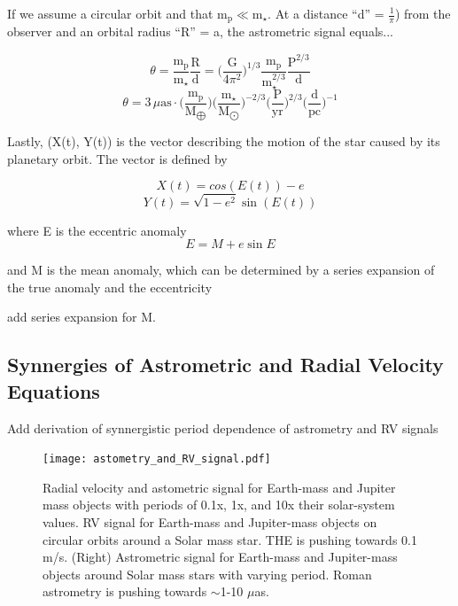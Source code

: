 \documentclass[twocolumn]{aastex631}
\newcommand{\dycomment}[1]{{\color{purple}#1}}
\begin{document}
If we assume a circular orbit and that $\textrm{m}_\textrm{p} \ll \textrm{m}_{\star}$. At a distance ``d'' = $\frac{1}{\pi}$) from the observer and an orbital radius ``R'' = a, the astrometric signal equals...

\begin{equation}
\theta = 
\frac{\textrm{m}_\textrm{p}}{\textrm{m}_{\star}} \frac{\textrm{R}}{\textrm{d}} = 
\Big(\frac{\textrm{G}}{4\pi^2} \Big)^{1/3}  
\frac{\textrm{m}_\textrm{p}}{\textrm{m}_{\star}^{2/3}}
\frac{\textrm{P}^{2/3}}{\textrm{d}}
\end{equation}
\begin{equation}
\theta = 
3 \, \mu \textrm{as} \cdot
\Big(\frac{\textrm{m}_\textrm{p}}{\textrm{M}_{\bigoplus}} \Big)
\Big(\frac{\textrm{m}_\star}{\textrm{M}_{\bigodot}} \Big)^{-2/3}
\Big(\frac{\textrm{P}}{\textrm{yr}} \Big)^{2/3}
\Big(\frac{\textrm{d}}{\textrm{pc}} \Big)^{-1}
\end{equation}

Lastly, (X(t), Y(t)) is the vector describing the motion of the star caused by its planetary orbit. The vector is defined by 

\begin{equation}
X(t) = cos(E(t)) - e
\end{equation}
\begin{equation}
Y(t) = \sqrt{1-e^2} \sin(E(t))
\end{equation}

where E is the eccentric anomaly
\begin{equation}
E = M + e\sin E
\end{equation}

and M is the mean anomaly, which can be determined by a series expansion of the true anomaly and the eccentricity \citep{smart1953}

\dycomment{add series expansion for M.}

\subsection{Synnergies of Astrometric and Radial Velocity Equations}

\dycomment{Add derivation of synnergistic period dependence of astrometry and RV signals}


\begin{figure}[htb] \label{fig: earth_and_jupiter}
    \centering 
    \texttt{[image: astometry\_and\_RV\_signal.pdf]}
    \caption{Radial velocity and astometric signal for Earth-mass and Jupiter mass objects with periods of 0.1x, 1x, and 10x their solar-system values. RV signal for Earth-mass and Jupiter-mass objects on circular orbits around a Solar mass star. THE is pushing towards 0.1 m/s. (Right) Astrometric signal for Earth-mass and Jupiter-mass objects around Solar mass stars with varying period. Roman astrometry is pushing towards $\sim$1-10 $\mu$as. }
\end{figure}
\end{document}
